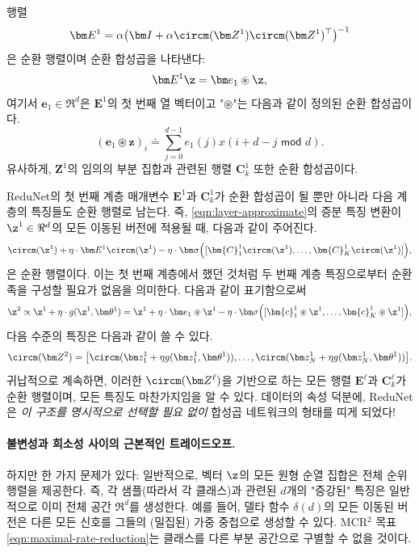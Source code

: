 \documentclass[../../book-main_ko.tex]{subfiles}
\begin{document}
\begin{proposition}[$\bm E^1$과 $\bm C^1_k$의 합성곱 구조]
행렬
\begin{equation}
    \bm E^1 = \alpha\big(\bm I + \alpha \circm(\bm Z^1) \circm(\bm Z^1)^\top \big)^{-1}
\end{equation}
은 순환 행렬이며 순환 합성곱을 나타낸다:
$$\bm E^1 \z = \bm e_1 \circledast \z,$$
여기서 $\bm e_1 \in \Re^d$은 $\bm E^1$의 첫 번째 열 벡터이고 "$\circledast$"는 다음과 같이 정의된 순환 합성곱이다.
\begin{equation*}
    (\bm e_1 \circledast \bm z)_{i} \doteq \sum_{j=0}^{d-1} e_1(j) x(i+ d-j \,\, \textsf{mod} \,\,d).
\end{equation*}
유사하게, $\bm Z^1$의 임의의 부분 집합과 관련된 행렬 $\bm C^1_k$ 또한 순환 합성곱이다.
\label{prop:circular-conv-1}
\end{proposition}

ReduNet의 첫 번째 계층 매개변수 $\bm E^1$과 $\bm{C}^1_k$가 순환 합성곱이 될 뿐만 아니라 다음 계층의 특징들도 순환 행렬로 남는다.
즉, \eqref{eqn:layer-approximate}의 증분 특징 변환이 $\z^1 \in \Re^d$의 모든 이동된 버전에 적용될 때, 다음과 같이 주어진다.
\begin{equation}
    \circm(\z^1) + \eta \cdot \bm E^1 \circm(\z^1) - \eta \cdot \bm \sigma \Big([\bm{C}_1^1 \circm(\z^1), \ldots, \bm{C}^1_K \circm(\z^1)] \Big),
\end{equation}
은 순환 행렬이다. 이는 첫 번째 계층에서 했던 것처럼 두 번째 계층 특징으로부터 순환 족을 구성할 필요가 없음을 의미한다.
다음과 같이 표기함으로써
\begin{equation}
\z^{2} \propto \z^{1} +\eta \cdot g(\z^{1}, \bm \theta^{1}) =  \z^1 + \eta \cdot \bm e_{1} \circledast \z^{1} -  \eta \cdot \bm \sigma\Big([\bm{c}_{1}^{1} \circledast \z^{1}, \dots, \bm{c}^{1}_{K} \circledast \z^{1}]\Big),
\label{eqn:approximate-convolution}
\end{equation}
다음 수준의 특징은 다음과 같이 쓸 수 있다.
$$\circm(\bm Z^2) = \big[ \circm( \bm z_{1}^1 + \eta g( \bm z_{1}^1, \bm \theta^1)), \dots, \circm( \bm z_{N}^1 + \eta g(\bm z_{N}^1, \bm \theta^1)) \big].$$
귀납적으로 계속하면, 이러한 $\circm(\bm Z^\ell)$을 기반으로 하는 모든 행렬 $\bm E^\ell$과 $\bm C^\ell_k$가 순환 행렬이며, 모든 특징도 마찬가지임을 알 수 있다.
데이터의 속성 덕분에, ReduNet은 {\em 이 구조를 명시적으로 선택할 필요 없이} 합성곱 네트워크의 형태를 띠게 되었다!

\paragraph{불변성과 희소성 사이의 근본적인 트레이드오프.} 
하지만 한 가지 문제가 있다: 일반적으로, 벡터 $\z$의 모든 원형 순열 집합은 전체 순위 행렬을 제공한다. 즉, 각 샘플(따라서 각 클래스)과 관련된 $d$개의 "증강된" 특징은 일반적으로 이미 전체 공간 $\Re^d$를 생성한다. 예를 들어, 델타 함수 $\delta(d)$의 모든 이동된 버전은 다른 모든 신호를 그들의 (밀집된) 가중 중첩으로 생성할 수 있다. MCR$^2$ 목표 \eqref{eqn:maximal-rate-reduction}는 클래스를 다른 부분 공간으로 구별할 수 없을 것이다.
\end{document}
